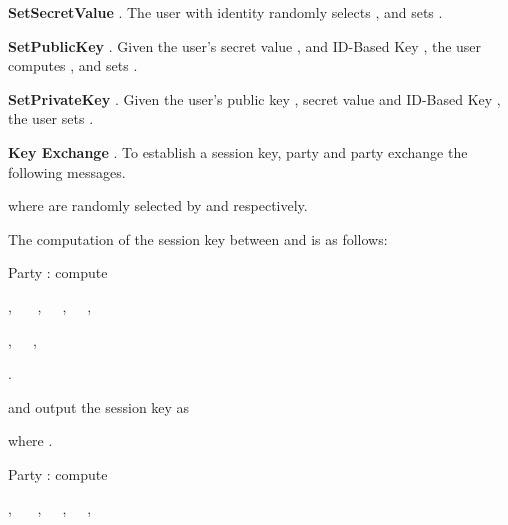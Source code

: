 \documentclass[final,1p,times,twocolumn]{elsarticle}
\begin{document}
{\bf SetSecretValue }. The user with identity  randomly selects , and sets .

\vspace{0.2cm}

{\bf SetPublicKey }. Given the user's secret value , and ID-Based Key , the user computes , and sets .

\vspace{0.2cm}

{\bf SetPrivateKey }. Given the  user's public key , secret value  and ID-Based Key , the user sets .

\vspace{0.2cm}

{\bf Key Exchange }. To establish a session key, party  and party  exchange the following messages.

\vspace{0.1cm}




\vspace{0.1cm}

where  are randomly selected by  and  respectively.

The computation of the session key between  and  is as follows:

Party : compute

\vspace{0.1cm}

, \ \ \ ,\ \ \ ,\ \ \ ,

\vspace{0.1cm}

,\ \ \  ,\ \ \ \

\vspace{0.1cm}

.

\vspace{0.1cm}

and output the session key as

\vspace{0.1cm}



\vspace{0.1cm}

where .

\vspace{0.2cm}

Party : compute

\vspace{0.1cm}

, \ \ \ ,\ \ \ ,\ \ \ ,

\vspace{0.1cm}
\end{document}

